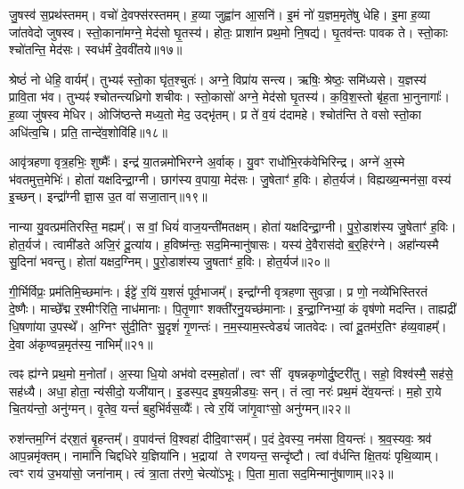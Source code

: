 जु॒षस्व॑ स॒प्रथ॑स्तमम्।
वचो॑ दे॒वफ्स॑रस्तमम्।
ह॒व्या जुह्वा॑न आ॒सनि॑।
इ॒मं नो॑ य॒ज्ञम॒मृते॑षु धेहि।
इ॒मा ह॒व्या जा॑तवेदो जुषस्व।
स्तो॒काना॑मग्ने॒ मेद॑सो घृ॒तस्य॑।
होतः॒ प्राशा॑न प्रथ॒मो नि॒षद्य॑।
घृ॒तव॑न्तः पावक ते।
स्तो॒काः श्चो॑तन्ति॒ मेद॑सः।
स्वध॑र्मं दे॒ववी॑तये॥१७॥\ip

श्रेष्ठं॑ नो धेहि॒ वार्यम्᳚।
तुभ्यꣴ॑ स्तो॒का घृ॑त॒श्चुतः॑।
अग्ने॒ विप्रा॑य सन्त्य।
ऋषिः॒ श्रेष्ठः॒ समि॑ध्यसे।
य॒ज्ञस्य॑ प्रावि॒ता भ॑व।
तुभ्यꣴ॑ श्चोतन्त्यध्रिगो शचीवः।
स्तो॒कासो॑ अग्ने॒ मेद॑सो घृ॒तस्य॑।
क॒वि॒श॒स्तो बृ॑ह॒ता भा॒नुनागाः᳚।
ह॒व्या जु॑षस्व मेधिर।
ओजि॑ष्ठन्ते मध्य॒तो मेद॒ उद्भृ॑तम्।
प्र ते॑ व॒यं द॑दामहे।
श्चोत॑न्ति ते वसो स्तो॒का अधि॑त्व॒चि।
प्रति॒ तान्दे॑व॒शोवि॑हि॥१८॥\ip\anuvakamend[दे॒ववी॑तय॒ उद्भृ॑त॒न्त्रीणि॑ च]

आवृ॑त्रहणा वृत्र॒हभिः॒ शुष्मैः᳚।
इन्द्र॑ या॒तन्नमो॑भिरग्ने अ॒र्वाक्।
यु॒वꣳ राधो॑भि॒रक॑वेभिरिन्द्र।
अग्ने॑ अ॒स्मे भ॑वतमुत्त॒मेभिः॑।
होता॑ यक्षदिन्द्रा॒ग्नी।
छाग॑स्य व॒पाया॒ मेद॑सः।
जु॒षेताꣳ॑ ह॒विः।
होत॒र्यज॑।
विह्यख्य॒न्मन॑सा॒ वस्य॑ इ॒च्छन्।
इन्द्रा᳚ग्नी ज्ञा॒स उ॒त वा॑ सजा॒तान्॥१९॥\ip\phantom{वा॑}%

नान्या यु॒वत्प्रम॑तिरस्ति॒ मह्यम्᳚।
स वां॒ धियं॑ वाज॒यन्ती॑मतक्षम्।
होता॑ यक्षदिन्द्रा॒ग्नी।
पु॒रो॒डाश॑स्य जु॒षेताꣳ॑ ह॒विः।
होत॒र्यज॑।
त्वामी॑डते अजि॒रं दू॒त्या॑य।
ह॒विष्म॑न्तः॒ सद॒मिन्मानु॑षासः।
यस्य॑ दे॒वैरास॑दो ब॒र्‌॒\mbox{}हिर॑ग्ने।
अहा᳚न्यस्मै सु॒दिना॑ भवन्तु।
होता॑ यक्षद॒ग्निम्।
पु॒रो॒डाश॑स्य जु॒षताꣳ॑ ह॒विः।
होत॒र्यज॑॥२०॥\ip\anuvakamend[स॒जा॒तान॒ग्निन्द्वे च॑]

गी॒र्भिर्विप्रः॒ प्रम॑तिमि॒च्छमा॑नः।
ईट्टे॑ र॒यिं य॒शसं॑ पूर्व॒भाजम्᳚।
इन्द्रा᳚ग्नी वृत्रहणा सुवज्रा।
प्र णो॒ नव्ये॑भिस्तिरतं दे॒ष्णैः।
माच्छे᳚द्म र॒श्मीꣳरिति॒ नाध॑मानाः।
पि॒तृ॒णाꣳ शक्ती॑रनु॒\-यच्छ॑मानाः।
इ॒न्द्रा॒ग्निभ्यां॒ कं वृष॑णो मदन्ति।
ताह्यद्री॑ धि॒षणा॑या उ॒पस्थे᳚।
अ॒ग्निꣳ सु॑दी॒तिꣳ सु॒दृशं॑ गृ॒णन्तः॑।
न॒म॒स्याम॒स्त्वेड्यं॑ जातवेदः।
त्वां दू॒तम॑र॒तिꣳ ह॑व्य॒वाहम्᳚।
दे॒वा अ॑कृण्वन्न॒मृत॑स्य॒ नाभिम्᳚॥२१॥\ip\anuvakamend[जा॒त॒वे॒दो॒ द्वे च॑]

त्वꣴ ह्य॑ग्ने प्रथ॒मो म॒नोता᳚।
अ॒स्या धि॒यो अभ॑वो दस्म॒होता᳚।
त्वꣳ सीं वृषन्नकृणोर्दु॒ष्टरी॑तु।
सहो॒ विश्व॑स्मै॒ सह॑से॒ सह॑ध्यै।
अधा॒ होता॒ न्य॑सीदो॒ यजी॑यान्।
इ॒डस्प॒द इ॒षय॒न्नीड्यः॒ सन्।
तं त्वा॒ नरः॑ प्रथ॒मं दे॑व॒यन्तः॑।
म॒हो रा॒ये चि॒तय॑न्तो॒ अनु॑ग्मन्।
वृ॒तेव॒ यन्तं॑ ब॒हुभि॑र्वस॒व्यैः᳚।
त्वे र॒यिं जा॑गृ॒वाꣳसो॒ अनु॑ग्मन्॥२२॥\ip

रुश॑न्तम॒ग्निं द॑र्‌\mbox{}श॒तं बृ॒हन्तम्᳚।
व॒पाव॑न्तं वि॒श्वहा॑ दीदि॒वाꣳसम्᳚।
प॒दं दे॒वस्य॒ नम॑सा वि॒यन्तः॑।
श्र॒व॒स्यवः॒ श्रव॑ आप॒न्नमृ॑क्तम्।
नामा॑नि चिद्दधिरे य॒ज्ञिया॑नि।
भ॒द्रायां ते रणयन्त॒ सन्दृ॑ष्टौ।
त्वां व॑र्धन्ति क्षि॒तयः॑ पृथि॒व्याम्।
त्वꣳ राय॑ उ॒भया॑सो॒ जना॑नाम्।
त्वं त्रा॒ता त॑रणे॒ चेत्यो॑ऽभूः।
पि॒ता मा॒ता सद॒मिन्मानु॑षाणाम्॥२३॥\ip

